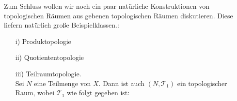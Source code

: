 Zum Schluss wollen wir noch ein paar natürliche Konstruktionen von topologischen Räumen aus gebenen topologischen Räumen diskutieren. 
Diese liefern natürlich große Beispielklassen.:
\begin{bsp}
\begin{enumerate}
\item[i)] Produktopologie
\item[ii)] Quotiententopologie
\item[iii)] Teilraumtopologie. \\
	Sei $N$ eine Teilmenge von $X$. Dann ist auch $(N,\mathcal{T}_1)$ ein topologischer Raum, wobei $\mathcal{T}_1$ wie folgt gegeben ist:\\
\end{enumerate}
\end{bsp}

